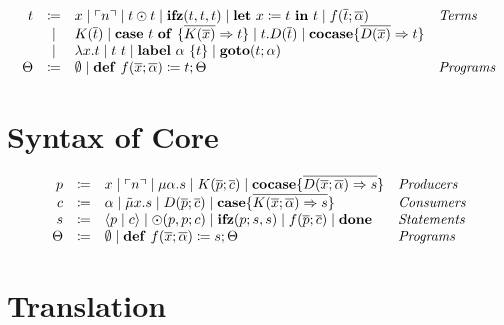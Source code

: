 \documentclass[nonacm]{acmart}
\newcommand{\lit}[1]{\ensuremath{\ulcorner #1\urcorner}}
\newcommand{\cut}[2]{\ensuremath{\langle #1 \mid #2 \rangle}}
\newcommand{\letin}[3]{\ensuremath{\mathbf{let}\ #1 \coloneqq #2\ \mathbf{in}\ #3}}
\newcommand{\caseof}[2]{\ensuremath{\mathbf{case}\ #1\ \mathbf{of}\ \{ #2 \}}}
\begin{document}
\begin{definition}
  \[ 
    \begin{array}{r c l l}
      t & \coloneqq & x \mid \lit{n} \mid t \odot t \mid \mathbf{ifz}(t,t,t) \mid \letin{x}{t}{t} \mid f(\overline{t};\overline{\alpha}) & \emph{Terms}\\

      & \mid & K(\overline{t}) \mid \caseof{t}{\overline{K(\overline{x})} \Rightarrow t} \mid t.D(\overline{t}) \mid \mathbf{cocase} \{ \overline{ D(\overline{x})} \Rightarrow t \} &\\
      & \mid & \lambda x.t \mid t\ t \mid \mathbf{label}\ \alpha\ \{t\} \mid \mathbf{goto}(t;\alpha) & \\
      \Theta & \coloneqq & \emptyset \mid \mathbf{def}\ f(\overline{x};\overline{\alpha}) \coloneq t; \Theta & \emph{Programs}\\
    \end{array}
  \]
\end{definition}

\section{Syntax of Core}
\label{sec:syntax-of-core}

\begin{definition}
  \[
    \begin{array}{rcll}
      p & \coloneqq & x \mid \lit{n} \mid \mu \alpha.s \mid K(\overline{p};\overline{c}) \mid \mathbf{cocase} \{ \overline{D(\overline{x};\overline{\alpha}) \Rightarrow s}\} & \emph{Producers}\\
      c & \coloneqq & \alpha \mid \tilde{\mu} x.s \mid D(\overline{p};\overline{c}) \mid \mathbf{case} \{ \overline{K(\overline{x};\overline{\alpha}) \Rightarrow s} \}& \emph{Consumers}\\
      s & \coloneqq & \cut{p}{c} \mid \odot(p,p;c) \mid \mathbf{ifz}(p;s,s) \mid f(\overline{p};\overline{c}) \mid \mathbf{done} & \emph{Statements}\\
      \Theta & \coloneqq & \emptyset \mid \mathbf{def}\ f(\overline{x};\overline{\alpha}) \coloneq s; \Theta & \emph{Programs}\\
    \end{array}
  \]
\end{definition}

\section{Translation}
\label{sec:translation}
\end{document}
